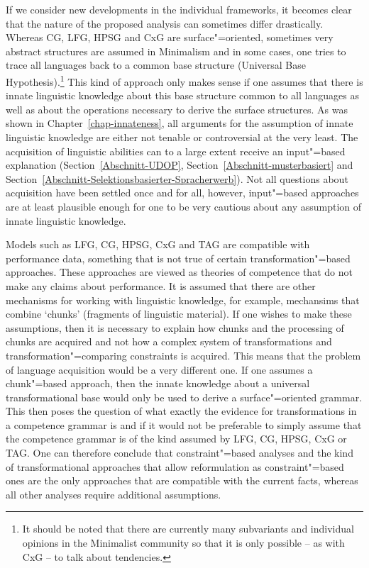If we consider new developments in the individual frameworks, it becomes clear that the nature of the proposed analysis can sometimes differ drastically.
Whereas CG, LFG, HPSG and CxG are surface"=oriented, sometimes very abstract structures are assumed in Minimalism and in some cases, one tries to trace all languages back
to a common base structure (Universal Base Hypothesis).\footnote{
  It should be noted that there are currently many subvariants and individual opinions in the Minimalist community so that it
  is only possible -- as with CxG -- to talk about tendencies.%
} This kind of approach only makes sense if one assumes that there is innate linguistic knowledge about this base structure
common to all languages as well as about the operations necessary to derive the surface structures.
As was shown in Chapter~\ref{chap-innateness}, all arguments for the assumption of innate linguistic knowledge are either not tenable
or controversial at the very least.
The acquisition of linguistic abilities can to a large extent receive an input"=based explanation
(Section~\ref{Abschnitt-UDOP}, Section~\ref{Abschnitt-musterbasiert} and
Section~\ref{Abschnitt-Selektionsbasierter-Spracherwerb}). Not all questions about acquisition have been settled once and for all, however, input"=based approaches
are at least plausible enough for one to be very cautious about any assumption of innate linguistic knowledge.

Models such as LFG, CG, HPSG, CxG and TAG are compatible with performance data, something that is not true of certain transformation"=based approaches.
These approaches are viewed as theories of competence that do not make any claims about performance. It is assumed that there are other mechanisms
for working with linguistic knowledge, for example, mechansims that combine `chunks' (fragments of linguistic material). If one wishes to make these assumptions,
then it is necessary to explain how chunks and the processing of chunks are acquired and not how a complex system of transformations and transformation"=comparing
constraints is acquired. This means that the problem of language acquisition would be a very different one. If one assumes a chunk"=based approach, then the innate
knowledge about a universal transformational base would only be used to derive a surface"=oriented grammar. This then poses the question of what exactly the evidence
for transformations in a competence grammar is and if it would not be preferable to simply assume that the competence grammar is of the kind assumed by LFG, CG, HPSG,
CxG or TAG. One can therefore conclude that constraint"=based analyses and the kind of transformational approaches that allow reformulation as constraint"=based ones
are the only approaches that are compatible with the current facts, whereas all other analyses require additional assumptions.

